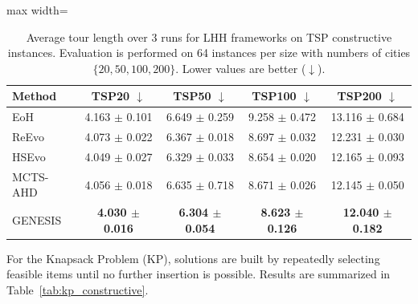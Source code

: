 \documentclass[sigconf,anonymous]{aamas}
\begin{document}
\begin{table}[!htbp]
\centering
\scriptsize
\setlength{\tabcolsep}{3pt}

\caption{Average tour length over 3 runs for LHH frameworks on TSP constructive instances. Evaluation is performed on 64 instances per size with numbers of cities $\{20,50,100,200\}$. Lower values are better ($\downarrow$).}
\label{tab:tsp_constructive_transposed}
\begin{adjustbox}{max width=\columnwidth}
\begin{tabular}{@{}lcccc@{}}
\toprule
Method 
& TSP20 $\downarrow$ 
& TSP50 $\downarrow$ 
& TSP100 $\downarrow$ 
& TSP200 $\downarrow$ \\
\midrule
EoH      & 4.163 $\pm$ 0.101 & 6.649 $\pm$ 0.259 & 9.258 $\pm$ 0.472 & 13.116 $\pm$ 0.684 \\
ReEvo    & 4.073 $\pm$ 0.022 & 6.367 $\pm$ 0.018 & 8.697 $\pm$ 0.032 & 12.231 $\pm$ 0.030 \\
HSEvo    & 4.049 $\pm$ 0.027 & 6.329 $\pm$ 0.033 & 8.654 $\pm$ 0.020 & 12.165 $\pm$ 0.093 \\
MCTS-AHD & 4.056 $\pm$ 0.018 & 6.635 $\pm$ 0.718 & 8.671 $\pm$ 0.026 & 12.145 $\pm$ 0.050 \\
GENESIS  & \textbf{4.030 $\pm$ 0.016} & \textbf{6.304 $\pm$ 0.054} & \textbf{8.623 $\pm$ 0.126} & \textbf{12.040 $\pm$ 0.182} \\
\bottomrule
\end{tabular}
\end{adjustbox}
\end{table}

For the Knapsack Problem (KP), solutions are built by repeatedly selecting feasible items until no further insertion is possible. Results are summarized in Table~\ref{tab:kp_constructive}.
\end{document}
